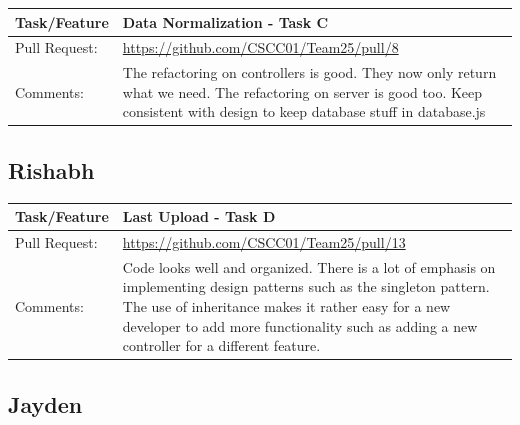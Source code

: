 \documentclass[12pt]{article}
\begin{document}
\begin{table}[H]
\begin{tabular}{|p{3cm}|p{11cm}|}
\hline
Task/Feature  & Data Normalization - Task C
 \\ \hline
Pull Request: & \url{https://github.com/CSCC01/Team25/pull/8}                                                                                                                                                                                                                                                                                                                      \\ \hline
Comments:     & The refactoring on controllers is good. They now only return what we need.
The refactoring on server is good too. Keep consistent with design to keep database stuff in database.js

 \\ \hline
\end{tabular}
\end{table}

\subsection{Rishabh}

\begin{table}[H]
\begin{tabular}{|p{3cm}|p{11cm}|}
\hline
Task/Feature  & Last Upload - Task D
 \\ \hline
Pull Request: & \url{https://github.com/CSCC01/Team25/pull/13}                                                                                                                                                                                                                                                                                                                      \\ \hline

Comments:     & Code looks well and organized. There is a lot of emphasis on implementing design patterns such as the singleton pattern. The use of inheritance makes it rather easy for a new developer to add more functionality such as adding a new controller for a different feature.
 \\ \hline
\end{tabular}
\end{table}

\subsection{Jayden}
\end{document}

